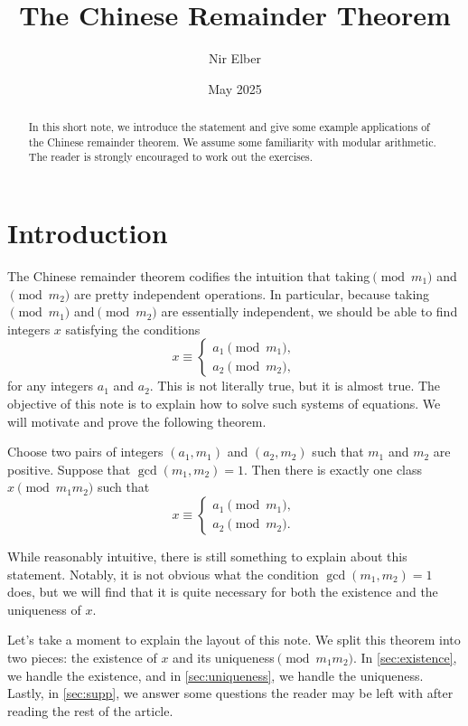 \documentclass{article}
\title{The Chinese Remainder Theorem}
\author{Nir Elber}
\date{May 2025}
\begin{document}
\maketitle

\begin{abstract}
	In this short note, we introduce the statement and give some example applications of the Chinese remainder theorem. We assume some familiarity with modular arithmetic. The reader is strongly encouraged to work out the exercises.
\end{abstract}

\tableofcontents

\setcounter{section}{0}
\section{Introduction}
The Chinese remainder theorem codifies the intuition that taking$\pmod{m_1}$ and$\pmod{m_2}$ are pretty independent operations. In particular, because taking$\pmod{m_1}$ and$\pmod{m_2}$ are essentially independent, we should be able to find integers $x$ satisfying the conditions
\[x\equiv\begin{cases}
	a_1\pmod{m_1}, \\
	a_2\pmod{m_2},
\end{cases}\]
for any integers $a_1$ and $a_2$. This is not literally true, but it is almost true. The objective of this note is to explain how to solve such systems of equations. We will motivate and prove the following theorem.
\begin{theorem} \label{thm:crt}
	Choose two pairs of integers $(a_1,m_1)$ and $(a_2,m_2)$ such that $m_1$ and $m_2$ are positive. Suppose that $\gcd(m_1,m_2)=1$. Then there is exactly one class $x\pmod{m_1m_2}$ such that
	\[x\equiv\begin{cases}
		a_1 \pmod{m_1}, \\
		a_2 \pmod{m_2}.
	\end{cases}\]
\end{theorem}
While reasonably intuitive, there is still something to explain about this statement. Notably, it is not obvious what the condition $\gcd(m_1,m_2)=1$ does, but we will find that it is quite necessary for both the existence and the uniqueness of $x$.

Let's take a moment to explain the layout of this note. We split this theorem into two pieces: the existence of $x$ and its uniqueness$\pmod{m_1m_2}$. In \cref{sec:existence}, we handle the existence, and in \cref{sec:uniqueness}, we handle the uniqueness. Lastly, in \cref{sec:supp}, we answer some questions the reader may be left with after reading the rest of the article.
\end{document}

